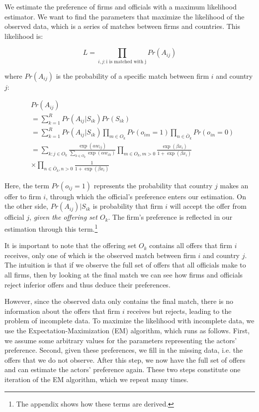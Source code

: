 We estimate the preference of firms and officials with a maximum likelihood estimator. We want to find the parameters that maximize the likelihood of the observed data, which is a series of matches between firms and countries. This likelihood is:

\[
L = \prod_{i,j: \text{i is matched with j}} Pr(A_{ij})
\]

where $Pr(A_{ij})$ is the probability of a specific match between firm $i$ and country $j$:

\begin{align}
&Pr(A_{ij}) \\
&= \sum_{k=1}^R Pr(A_{ij}|S_{ik}) Pr(S_{ik}) \\
&= \sum_{k=1}^R Pr(A_{ij} | S_{ik}) \prod_{m \in O_k} Pr(o_{im} = 1) \prod_{n \in \bar O_k} Pr(o_{in} = 0) \\
&= \sum_{k:j \in O_k} \frac{\exp(\alpha w_{ij})}{\displaystyle\sum_{h \in O_k} \exp(\alpha w_{ih})} \prod_{m \in O_k, m > 0} \frac{\exp(\beta x_{i})}{1 + \exp(\beta x_i)} \\
&\times \prod_{n \in \bar O_k, n > 0} \frac{1}{1 + \exp(\beta x_i)}
\end{align}

Here, the term $Pr(o_{ij} = 1)$ represents the probability that country $j$ makes an offer to firm $i$, through which the official's preference enters our estimation. On the other side, $Pr(A_{ij}) | S_{ik}$ is probability that firm $i$ will accept the offer from official $j$, \textit{given the offering set $O_k$}. The firm's preference is reflected in our estimation through this term.\footnote{The appendix shows how these terms are derived.}

It is important to note that the offering set $O_k$ contains all offers that firm $i$ receives, only one of which is the observed match between firm $i$ and country $j$. The intuition is that if we observe the full set of offers that all officials make to all firms, then by looking at the final match we can see how firms and officials reject inferior offers and thus deduce their preferences.

However, since the observed data only contains the final match, there is no information about the offers that firm $i$ receives but rejects, leading to the problem of incomplete data. To maximize the likelihood with incomplete data, we use the Expectation-Maximization (EM) algorithm, which runs as follows. First, we assume some arbitrary values for the parameters representing the actors' preference. Second, given these preferences, we fill in the missing data, i.e. the offers that we do not observe. After this step, we now have the full set of offers and can estimate the actors' preference again. These two steps constitute one iteration of the EM algorithm, which we repeat many times. 

